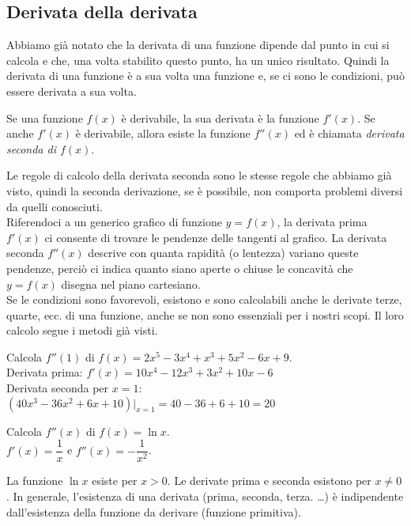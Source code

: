 \subsection{Derivata della derivata}
\label{}
Abbiamo già notato che la derivata  di una funzione dipende dal punto in cui si 
calcola e che, una volta stabilito questo punto, ha un unico risultato.
Quindi la derivata di una funzione è a sua volta una funzione e,
se ci sono le condizioni, può essere derivata a sua volta.
\begin{definizione}
 Se una funzione $f(x)$ è derivabile, la sua derivata è la funzione $f'(x)$.
 Se anche $f'(x)$ è derivabile, allora esiste la funzione $f''(x)$ ed è
 chiamata \emph{derivata seconda di $f(x)$}.
\end{definizione}
Le regole di calcolo della derivata seconda sono le stesse regole che abbiamo 
già visto, quindi la seconda derivazione, se è possibile, non comporta problemi 
diversi da quelli conosciuti.\\
Riferendoci a un generico grafico di funzione $y=f(x)$, la derivata prima 
$f'(x)$ ci consente di trovare le pendenze delle tangenti al grafico. La
derivata seconda $f''(x)$ descrive con quanta rapidità (o lentezza) variano 
queste pendenze, perciò ci indica quanto siano aperte o chiuse le concavità che
$y=f(x)$ disegna nel piano cartesiano.\\
Se le condizioni sono favorevoli, esistono e sono calcolabili anche le derivate 
terze, quarte, ecc. di una funzione, anche se non sono essenziali per i nostri 
scopi. Il loro calcolo segue i metodi già visti.

\begin{esempio}
Calcola $f''(1)$ di $f(x)=2x^5-3x^4+x^3+5x^2-6x+9$.\\
Derivata prima: $f'(x)=10 x^4-12 x^3+3x^2+10 x-6$\\
Derivata seconda per $x=1$: $(40x^3-36x^2+6x+10)|_{x=1}=40-36+6+10=20$
\end{esempio}

\begin{esempio}
Calcola $f''(x)$ di $f(x)=\ln x$.\\
$f'(x)=\dfrac{1}{x}$ e $f''(x)=-\dfrac{1}{x^2}$.\\
\begin{osservazione}
 La funzione $\ln x $ esiste per $x>0$. Le derivate prima e seconda esistono
 per $x\ne 0$.
 In generale, l'esistenza di una derivata (prima, seconda, terza. \dots) è
 indipendente dall'esistenza della funzione da derivare (funzione primitiva).
\end{osservazione}
\end{esempio}

